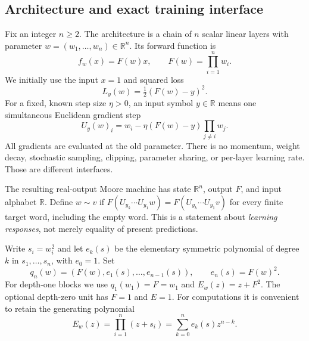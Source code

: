 \documentclass[11pt]{article}
\theoremstyle{definition}\newtheorem{definition}[theorem]{Definition}
\theoremstyle{remark}\newtheorem{remark}[theorem]{Remark}
\newcommand{\R}{\mathbb R}
\begin{document}
\subsection{Architecture and exact training interface}
Fix an integer $n\ge2$. The architecture is a chain of $n$ scalar linear layers with parameter $w=(w_1,\ldots,w_n)\in\R^n$. Its forward function is
\[
 f_w(x)=F(w)x,\qquad F(w)=\prod_{i=1}^n w_i.
\]
We initially use the input $x=1$ and squared loss
\[
 L_y(w)=\tfrac12(F(w)-y)^2.
\]
For a fixed, known step size $\eta>0$, an input symbol $y\in\R$ means one simultaneous Euclidean gradient step
\begin{equation}\label{eq:update}
 U_y(w)_i=w_i-\eta(F(w)-y)\prod_{j\ne i}w_j.
\end{equation}
All gradients are evaluated at the old parameter. There is no momentum, weight decay, stochastic sampling, clipping, parameter sharing, or per-layer learning rate. Those are different interfaces.

The resulting real-output Moore machine has state $\R^n$, output $F$, and input alphabet $\R$. Define $w\sim v$ if $F(U_{y_k}\cdots U_{y_1}w)=F(U_{y_k}\cdots U_{y_1}v)$ for every finite target word, including the empty word. This is a statement about \emph{learning responses}, not merely equality of present predictions.

Write $s_i=w_i^2$ and let $e_k(s)$ be the elementary symmetric polynomial of degree $k$ in $s_1,\ldots,s_n$, with $e_0=1$. Set
\begin{equation}\label{eq:q}
 q_n(w)=(F(w),e_1(s),\ldots,e_{n-1}(s)),\qquad e_n(s)=F(w)^2.
\end{equation}
For depth-one blocks we use $q_1(w_1)=F=w_1$ and $E_w(z)=z+F^2$. The optional depth-zero unit has $F=1$ and $E=1$. For computations it is convenient to retain the generating polynomial
\[
 E_w(z)=\prod_{i=1}^n(z+s_i)=\sum_{k=0}^n e_k(s)z^{n-k}.
\]
\end{document}
